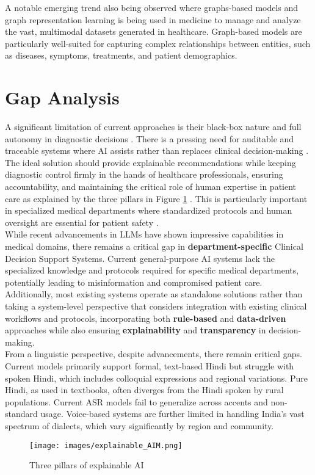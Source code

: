 \noindent A notable emerging trend also being observed where graphs-based models and graph representation learning \cite{johnson2024graph} is being used in medicine to manage and analyze the vast, multimodal datasets generated in healthcare. Graph-based models are particularly well-suited for capturing complex relationships between entities, such as diseases, symptoms, treatments, and patient demographics. 

\section{Gap Analysis}

\lettrine{A}{ } significant limitation of current approaches is their black-box nature and full autonomy in diagnostic decisions \cite{clusmann2023future}. There is a pressing need for auditable and traceable systems where AI assists rather than replaces clinical decision-making \cite{cohen2022intelligent}. The ideal solution should provide explainable recommendations while keeping diagnostic control firmly in the hands of healthcare professionals, ensuring accountability, and maintaining the critical role of human expertise in patient care as explained by the three pillars in Figure \ref{fig:explainable_AIM} \cite{explainableAIM}. This is particularly important in specialized medical departments where standardized protocols and human oversight are essential for patient safety \cite{cohen2022intelligent}.\\[\baselineskip]

\noindent While recent advancements in LLMs have shown impressive capabilities in medical domains, there remains a critical gap in \textcolor{TUMRed}{\textbf{department-specific}} Clinical Decision Support Systems. Current general-purpose AI systems lack the specialized knowledge and protocols required for specific medical departments, potentially leading to misinformation and compromised patient care. Additionally, most existing systems operate as standalone solutions rather than taking a system-level perspective that considers integration with existing clinical workflows and protocols, incorporating both \textcolor{TUMRed}{\textbf{rule-based}} and \textcolor{TUMRed}{\textbf{data-driven}} approaches while also ensuring \textcolor{TUMRed}{\textbf{explainability}} and \textcolor{TUMRed}{\textbf{transparency}} in decision-making.\\[\baselineskip]

\noindent From a linguistic perspective, despite advancements, there remain critical gaps. Current models primarily support formal, text-based Hindi but struggle with spoken Hindi, which includes colloquial expressions and regional variations. Pure Hindi, as used in textbooks, often diverges from the Hindi spoken by rural populations. Current ASR models fail to generalize across accents and non-standard usage. Voice-based systems are further limited in handling India's vast spectrum of dialects, which vary significantly by region and community.\\[\baselineskip]

\begin{figure}[H]
    \centering
    \texttt{[image: images/explainable\_AIM.png]}
    \caption{Three pillars of explainable AI}
    \label{fig:explainable_AIM}
\end{figure}